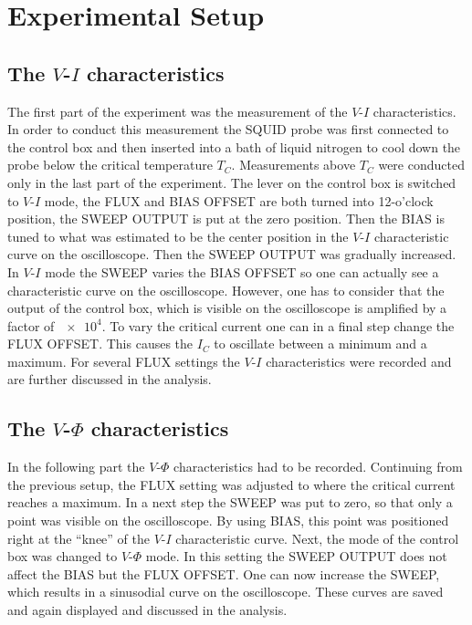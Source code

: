 \documentclass[a4paper,10pt]{article}
\begin{document}
\section{Experimental Setup}

\subsection{The $V$-$I$ characteristics}
\label{setup_vi}
The first part of the experiment was the measurement of the $V$-$I$ characteristics. In order to conduct this measurement the SQUID probe was first connected to the control box and then inserted into a bath of liquid nitrogen to cool down the probe below the critical temperature $T_C$. Measurements above $T_C$ were conducted only in the last part of the experiment. 
The lever on the control box is switched to $V$-$I$ mode, the FLUX and BIAS OFFSET are both turned into 12-o'clock position, the SWEEP OUTPUT is put at the zero position. Then the BIAS is tuned to what was estimated to be the center position in the $V$-$I$ characteristic curve on the oscilloscope. Then the SWEEP OUTPUT was gradually increased. In $V$-$I$ mode the SWEEP varies the BIAS OFFSET so one can actually see a characteristic curve on the oscilloscope. However, one has to consider that the output of the control box, which is visible on the oscilloscope is amplified by a factor of $\num{e4}$.\cite{skriptum} 
To vary the critical current one can in a final step change the FLUX OFFSET. This causes the $I_C$ to oscillate between a minimum and a maximum. For several FLUX settings the $V$-$I$ characteristics were recorded and are further discussed in the analysis.

\subsection{The $V$-$\Phi$ characteristics}
In the following part the $V$-$\Phi$ characteristics had to be recorded. Continuing from the previous setup, the FLUX setting was adjusted to where the critical current reaches a maximum. In a next step the SWEEP was put to zero, so that only a point was visible on the oscilloscope. By using BIAS, this point was positioned right at the ``knee'' of the $V$-$I$ characteristic curve. 
Next, the mode of the control box was changed to $V$-$\Phi$ mode. In this setting the SWEEP OUTPUT does not affect the BIAS but the FLUX OFFSET. One can now increase the SWEEP, which results in a sinusodial curve on the oscilloscope. These curves are saved and again displayed and discussed in the analysis.  
\end{document}
